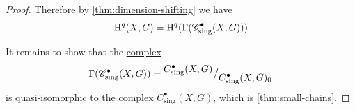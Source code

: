 \documentclass[../../main]{subfiles}
\begin{document}
\begin{proof}
  Therefore by \autoref{thm:dimension-shifting} we have
  \begin{equation*}
    \operatorname{H}^{q}(X, G) = \operatorname{H}^{q}(\Gamma(\mathscr{C}_{\operatorname{sing}}^{\bullet}(X, G)))
  \end{equation*}

  It remains to show that the \hyperref[def:complex]{complex}
  \begin{equation*}
    \Gamma(\mathscr{C}_{\operatorname{sing}}^{\bullet}(X, G)) = {^{\textstyle C_{\operatorname{sing}}^{\bullet}(X, G)}\big/_{\textstyle C_{\operatorname{sing}}^{\bullet}(X, G)_{0}}}
  \end{equation*}
  is \hyperref[def:quasi-isomorphism]{quasi-isomorphic} to the \hyperref[def:complex]{complex} \(C_{\operatorname{sing}}^{\bullet}(X, G)\), which is \autoref{thm:small-chains}.
\end{proof}
\end{document}
